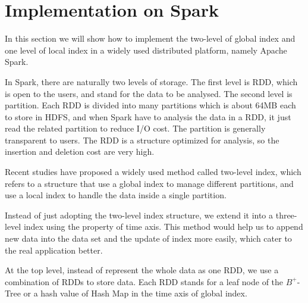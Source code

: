 \documentclass[sigplan]{acmart}
\begin{document}
\section{Implementation on Spark}
In this section we will show how to implement the two-level of global index and one level of local index in a widely used distributed platform, namely Apache Spark.\par
In Spark, there are naturally two levels of storage. The first level is RDD, which is open to the users, and stand for the data to be analysed. The second level is partition. Each RDD is divided into many partitions which is about 64MB each to store in HDFS, and when Spark have to analysis the data in a RDD, it just read the related partition to reduce I/O cost. The partition is generally transparent to users. The RDD is a structure optimized for analysis, so the insertion and deletion cost are very high.\par
Recent studies have proposed a widely used method called two-level index, which refers to a structure that use a global index to manage different partitions, and use a local index to handle the data inside a single partition.\par
Instead of just adopting the two-level index structure, we extend it into a three-level index using the property of time axis. This method would help us to append new data into the data set and the update of index more easily, which cater to the real application better.\par
At the top level, instead of represent the whole data as one RDD, we use a combination of RDDs to store data. Each RDD stands for a leaf node of the $B^+$-Tree or a hash value of Hash Map in the time axis of global index.






\end{document}
